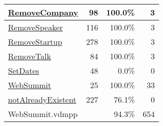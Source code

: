 \begin{longtable}{|l|r|r|r|}
\hline
\hyperref[RemoveCompany:98]{RemoveCompany} & 98&100.0\% & 3 \\
\hline
\hyperref[RemoveSpeaker:116]{RemoveSpeaker} & 116&100.0\% & 3 \\
\hline
\hyperref[RemoveStartup:278]{RemoveStartup} & 278&100.0\% & 3 \\
\hline
\hyperref[RemoveTalk:84]{RemoveTalk} & 84&100.0\% & 3 \\
\hline
\hyperref[SetDates:48]{SetDates} & 48&0.0\% & 0 \\
\hline
\hyperref[WebSummit:25]{WebSummit} & 25&100.0\% & 33 \\
\hline
\hyperref[notAlreadyExistent:227]{notAlreadyExistent} & 227&76.1\% & 0 \\
\hline
\hline
WebSummit.vdmpp & & 94.3\% & 654 \\
\hline
\end{longtable}


